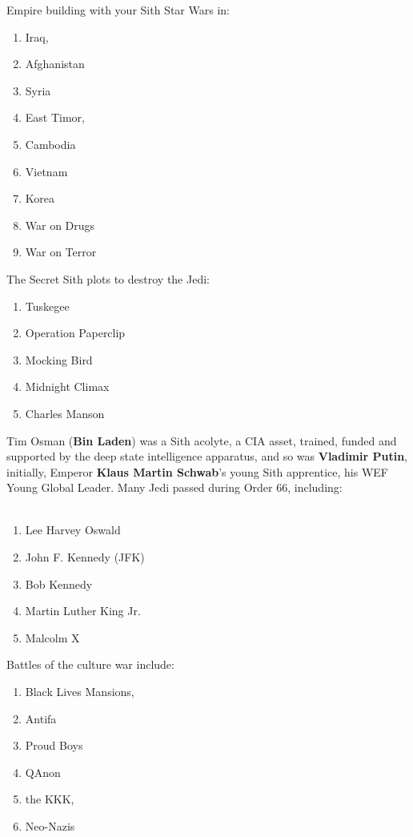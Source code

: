 \documentclass[16pt,openany,oneside]{book}
\begin{document}
\noindent Empire building with your Sith Star Wars in:
\begin{enumerate}
    \item Iraq, 
    \item Afghanistan
    \item Syria
    \item East Timor,
    \item Cambodia
    \item Vietnam 
    \item Korea
    \item War on Drugs 
    \item War on Terror
\end{enumerate}
\noindent The Secret Sith plots to destroy the Jedi:
\begin{enumerate}
    \item Tuskegee 
    \item Operation Paperclip
    \item Mocking Bird
    \item Midnight Climax
    \item Charles Manson
\end{enumerate}
\noindent Tim Osman (\textbf{Bin Laden}) was a Sith acolyte, a CIA asset, trained, funded and supported by the deep state intelligence apparatus, and so was \textbf{Vladimir Putin}, initially, Emperor \textbf{Klaus Martin Schwab}'s young Sith apprentice, his WEF Young Global Leader. Many Jedi passed during Order 66, including:
\\\\
\begin{enumerate}
    \item Lee Harvey Oswald
    \item John F. Kennedy (JFK)
    \item Bob Kennedy
    \item Martin Luther King Jr. 
    \item Malcolm X
\end{enumerate}

\noindent Battles of the culture war include: 

\begin{enumerate}
    \item Black Lives Mansions, 
    \item Antifa
    \item Proud Boys
    \item QAnon
    \item the KKK, 
    \item Neo-Nazis
\end{enumerate}
\end{document}
